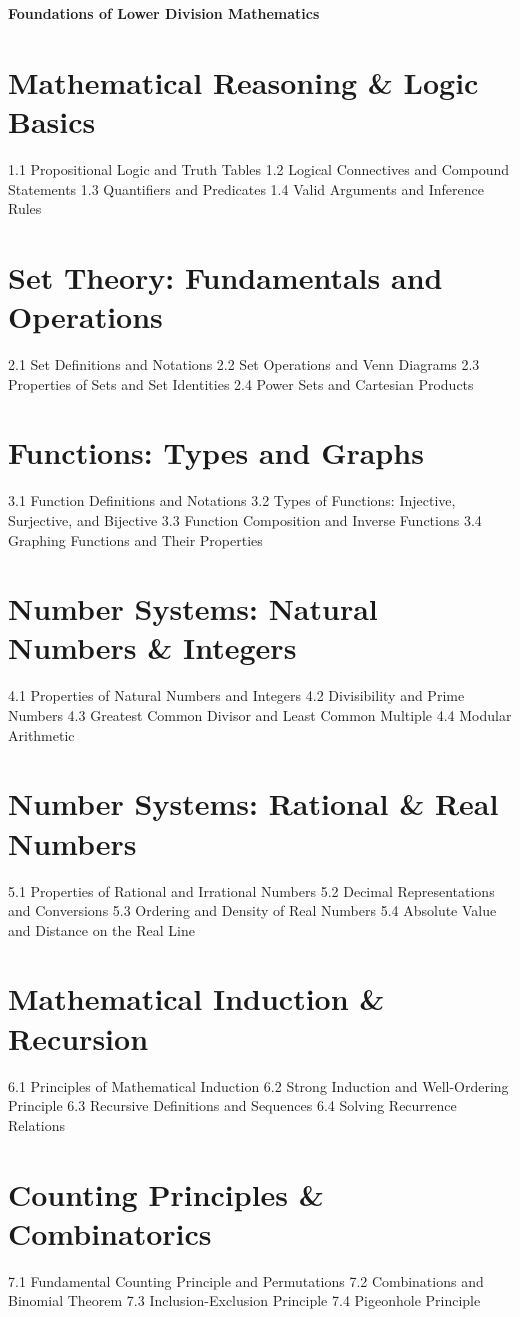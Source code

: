 {\LARGE \bf{Foundations of Lower Division Mathematics}}
\section{Mathematical Reasoning \& Logic Basics}
1.1 Propositional Logic and Truth Tables
1.2 Logical Connectives and Compound Statements
1.3 Quantifiers and Predicates
1.4 Valid Arguments and Inference Rules
\section{Set Theory: Fundamentals and Operations}
2.1 Set Definitions and Notations
2.2 Set Operations and Venn Diagrams
2.3 Properties of Sets and Set Identities
2.4 Power Sets and Cartesian Products
\section{Functions: Types and Graphs}
3.1 Function Definitions and Notations
3.2 Types of Functions: Injective, Surjective, and Bijective
3.3 Function Composition and Inverse Functions
3.4 Graphing Functions and Their Properties
\section{Number Systems: Natural Numbers \& Integers}
4.1 Properties of Natural Numbers and Integers
4.2 Divisibility and Prime Numbers
4.3 Greatest Common Divisor and Least Common Multiple
4.4 Modular Arithmetic
\section{Number Systems: Rational \& Real Numbers}
5.1 Properties of Rational and Irrational Numbers
5.2 Decimal Representations and Conversions
5.3 Ordering and Density of Real Numbers
5.4 Absolute Value and Distance on the Real Line
\section{Mathematical Induction \& Recursion}
6.1 Principles of Mathematical Induction
6.2 Strong Induction and Well-Ordering Principle
6.3 Recursive Definitions and Sequences
6.4 Solving Recurrence Relations
\section{Counting Principles \& Combinatorics}
7.1 Fundamental Counting Principle and Permutations
7.2 Combinations and Binomial Theorem
7.3 Inclusion-Exclusion Principle
7.4 Pigeonhole Principle
